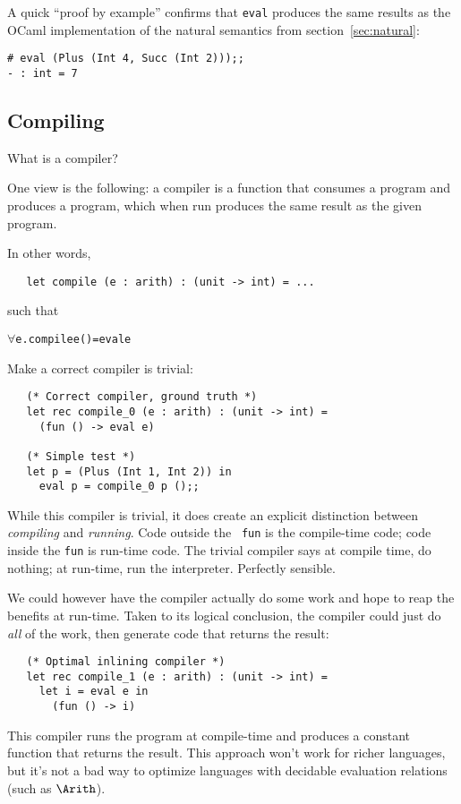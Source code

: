 A quick ``proof by example'' confirms that {\tt eval} produces the
same results as the OCaml implementation of the natural semantics from
section~\ref{sec:natural}:
\begin{verbatim}
# eval (Plus (Int 4, Succ (Int 2)));;
- : int = 7
\end{verbatim}

\subsection{Compiling}

What is a compiler?

One view is the following: a compiler is a function that consumes a
program and produces a program, which when run produces the same
result as the given program.

In other words,
\begin{verbatim}
   let compile (e : arith) : (unit -> int) = ...
\end{verbatim}
such that
\begin{alltt}
   \(\forall\)e. compile e () = eval e
\end{alltt}

Make a correct compiler is trivial:
\begin{verbatim}
   (* Correct compiler, ground truth *)
   let rec compile_0 (e : arith) : (unit -> int) =
     (fun () -> eval e)

   (* Simple test *)
   let p = (Plus (Int 1, Int 2)) in
     eval p = compile_0 p ();;
\end{verbatim}
While this compiler is trivial, it does create an explicit distinction
between \emph{compiling} and \emph{running}.  Code outside the {\tt
  fun} is the compile-time code; code inside the {\tt fun} is run-time
code.  The trivial compiler says at compile time, do nothing; at
run-time, run the interpreter.  Perfectly sensible.


We could however have the compiler actually do some work and hope to
reap the benefits at run-time.  Taken to its logical conclusion, the
compiler could just do \emph{all} of the work, then generate code that
returns the result:
\begin{verbatim}
   (* Optimal inlining compiler *)
   let rec compile_1 (e : arith) : (unit -> int) =
     let i = eval e in
       (fun () -> i)
\end{verbatim}
This compiler runs the program at compile-time and produces a constant
function that returns the result.  This approach won't work for richer
languages, but it's not a bad way to optimize languages with decidable
evaluation relations (such as $\Arith$).

